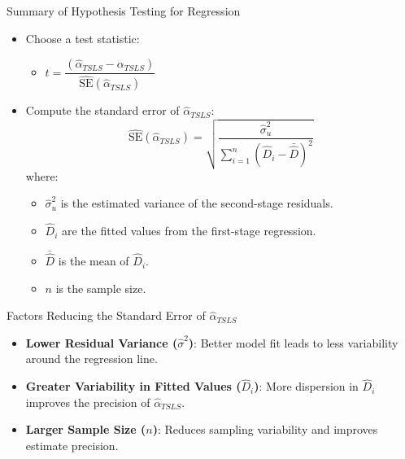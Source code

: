 \documentclass[dvipsnames,hyperref={pdfpagelabels=false}]{beamer}
\begin{document}
\begin{frame}{Summary of Hypothesis Testing for Regression}
	\begin{itemize}
		\item[3.] Choose a test statistic:
		\begin{itemize}
			\vspace{0.2cm}
			\item $t = \dfrac{(\hat{\alpha}_{TSLS}- \alpha_{TSLS})}{\hat{\mathrm{SE}}(\hat{\alpha}_{TSLS})}$
		\end{itemize}
		\vspace{0.3cm}
		\item[4.] Compute the standard error of \( \hat{\alpha}_{TSLS} \):
		\begin{equation*}
			\hat{\mathrm{SE}}(\hat{\alpha}_{TSLS}) = \sqrt{\frac{\hat{\sigma}_{u}^2}{\sum_{i=1}^n (\hat{D}_i - \bar{\hat{D}})^2}}
		\end{equation*}
		where:
								\vspace{0.2cm}
		\begin{itemize}
			\item \( \hat{\sigma}_{u}^2 \) is the estimated variance of the second-stage residuals.
									\vspace{0.2cm}
			\item \( \hat{D}_i \) are the fitted values from the first-stage regression.
									\vspace{0.2cm}
			\item \( \bar{\hat{D}} \) is the mean of \( \hat{D}_i \).
									\vspace{0.2cm}
			\item \( n \) is the sample size.
		\end{itemize}
	\end{itemize}
\end{frame}



\begin{frame}{Factors Reducing the Standard Error of \( \hat{\alpha}_{TSLS} \)}
	\begin{itemize}
		\item \textbf{Lower Residual Variance (\(\hat{\sigma}^2\))}: Better model fit leads to less variability around the regression line.
		\vspace{0.2cm}
		\item \textbf{Greater Variability in Fitted Values (\(\hat{D}_i\))}: More dispersion in $\hat{D}_i$ improves the precision of $\hat{\alpha}_{TSLS}$.
		\vspace{0.2cm}
		\item \textbf{Larger Sample Size ($n$)}: Reduces sampling variability and improves estimate precision.
	\end{itemize}
\end{frame}
\end{document}
